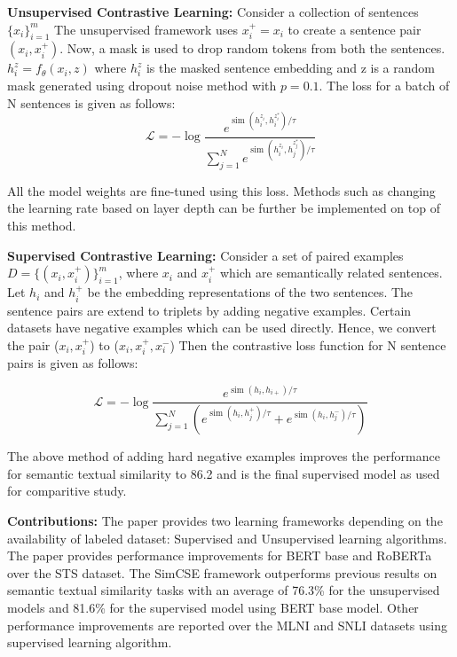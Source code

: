 \documentclass{article}
\begin{document}
\textbf{Unsupervised Contrastive Learning:}
Consider a collection of sentences $\{x_i\}^m_{i=1}$ The unsupervised framework uses $x^+_i = x_i$ to create a sentence pair $(x_i, x^+_i)$. Now, a mask is used to drop random tokens from both the sentences. $h^z_i = f_\theta(x_i, z)$
where $h^z_i$ is the masked sentence embedding  and z is a random mask generated using dropout noise method with $p = 0.1$. The loss for a batch of N sentences is given as follows:  
\vspace{-1em}
$$ \mathcal{L} = - \log \frac{e^{\operatorname{sim}(h^{z_i}_i, h^{z^*_i}_i)/ \tau} }{ \sum_{j=1}^{N} e^{\operatorname{sim} (h^{z_i}_i , h^{z^*_j}_j ) / \tau}}$$

All the model weights are fine-tuned using this loss. Methods such as changing the learning rate based on layer depth can be further be implemented on top of this method. 




\textbf{Supervised Contrastive Learning:
} 
Consider a set of paired examples $D = \{(x_i, x^+_i)\}^m_{i=1}$, where $x_i$ and $x^+_i$ which are semantically related sentences. Let $h_i$ and $h^+_i$ be the embedding representations of the two sentences.
The sentence pairs are extend to triplets by adding negative examples. Certain datasets have negative examples which can be used directly. Hence, we convert the pair ($x_i, x^+_i$) to ($x_i, x^+_i, x^-_i$) Then the contrastive loss function for N sentence pairs is given as follows: 

$$\mathcal{L} = -\log \frac{e^{\operatorname{sim}(h_i, h_{i+})/\tau}} {\sum_{j=1}^{N} ( e^{\operatorname{sim}(h_i, h^+_{j})/ \tau} + e^{\operatorname{sim}(h_i, h^-_{j})/ \tau})}    $$

The above method of adding hard negative examples improves the performance for semantic textual similarity to 86.2 and is the final supervised model as used for comparitive study.

\textbf{Contributions:
}The paper provides two learning frameworks depending on the availability of labeled dataset: Supervised and Unsupervised learning algorithms. The paper provides performance improvements for BERT base and RoBERTa over the STS dataset. The SimCSE framework outperforms previous results on semantic textual similarity tasks with an average of 76.3\% for the unsupervised models and 81.6\% for the supervised model using BERT base model. Other performance improvements are reported over the MLNI and SNLI datasets using supervised learning algorithm.
\end{document}

